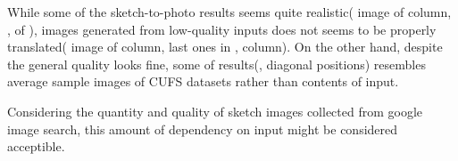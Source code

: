 While some of the sketch-to-photo results seems quite realistic( image of  column, ,  of ), images generated from low-quality inputs does not seems to be properly translated( image of  column, last ones in ,  column). 
On the other hand, despite the general quality looks fine, some of results(,  diagonal positions) resembles average sample images of CUFS datasets rather than contents of input.

Considering the quantity and quality of sketch images collected from google image search, this amount of dependency on input might be considered acceptible.

\endinput
